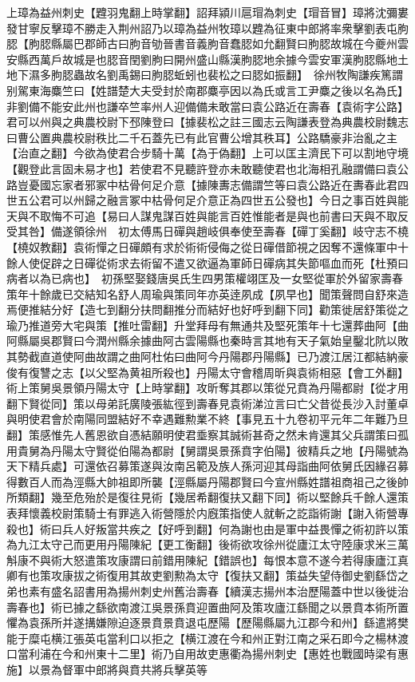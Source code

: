 上璋為益州刺史【韙羽鬼翻上時掌翻】詔拜潁川扈瑁為刺史【瑁音冒】璋將沈彌婁發甘寧反擊璋不勝走入荆州詔乃以璋為益州牧璋以韙為征東中郎將率衆擊劉表屯朐䏰【胊䏰縣屬巴郡師古曰朐音劬晉書音義朐音蠢䏰如允翻賢曰朐䏰故城在今夔州雲安縣西萬戶故城是也䏰音閏劉朐曰開州盛山縣漢胊䏰地余據今雲安軍漢朐䏰縣地土地下濕多朐䏰蟲故名劉禹錫曰朐䏰蚯蚓也裴松之曰䏰如振翻】　徐州牧陶謙疾篤謂别駕東海麋竺曰【姓譜楚大夫受封於南郡麋亭因以為氏或言工尹麋之後以名為氏】非劉備不能安此州也謙卒竺率州人迎備備未敢當曰袁公路近在壽春【袁術字公路】君可以州與之典農校尉下邳陳登曰【據裴松之註三國志云陶謙表登為典農校尉魏志曰曹公置典農校尉秩比二千石蓋先已有此官曹公增其秩耳】公路驕豪非治亂之主【治直之翻】今欲為使君合步騎十萬【為于偽翻】上可以匡主濟民下可以割地守境【觀登此言固未易才也】若使君不見聽許登亦未敢聽使君也北海相孔融謂備曰袁公路豈憂國忘家者邪冢中枯骨何足介意【據陳夀志備謂竺等曰袁公路近在夀春此君四世五公君可以州歸之融言冢中枯骨何足介意正為四世五公發也】今日之事百姓與能天與不取悔不可追【易曰人謀鬼謀百姓與能言百姓惟能者是與也前書曰天與不取反受其咎】備遂領徐州　初太傅馬日磾與趙岐俱奉使至壽春【磾丁奚翻】岐守志不橈【橈奴教翻】袁術憚之日磾頗有求於術術侵侮之從日磾借節視之因奪不還條軍中十餘人使促辟之日磾從術求去術留不遣又欲逼為軍師日磾病其失節嘔血而死【杜預曰病者以為已病也】　初孫堅娶錢唐吳氏生四男策權翊匡及一女堅從軍於外留家壽春策年十餘歲已交結知名舒人周瑜與策同年亦英逹夙成【夙早也】聞策聲問自舒來造焉便推結分好【造七到翻分扶問翻推分而結好也好呼到翻下同】勸策徙居舒策從之瑜乃推道旁大宅與策【推吐雷翻】升堂拜母有無通共及堅死策年十七還葬曲阿【曲阿縣屬吳郡賢曰今潤州縣余據曲阿古雲陽縣也秦時言其地有天子氣始皇鑿北阬以敗其勢截直道使阿曲故謂之曲阿杜佑曰曲阿今丹陽郡丹陽縣】已乃渡江居江都結納豪俊有復讐之志【以父堅為黄祖所殺也】丹陽太守會稽周昕與袁術相惡【會工外翻】術上策舅吳景領丹陽太守【上時掌翻】攻昕奪其郡以策從兄賁為丹陽都尉【從才用翻下賢從同】策以母弟託廣陵張紘徑到壽春見袁術涕泣言曰亡父昔從長沙入討董卓與明使君會於南陽同盟結好不幸遇難勲業不終【事見五十九卷初平元年二年難乃旦翻】策感惟先人舊恩欲自憑結願明使君埀察其誠術甚奇之然未肯還其父兵謂策曰孤用貴舅為丹陽太守賢從伯陽為都尉【舅謂吳景孫賁字伯陽】彼精兵之地【丹陽號為天下精兵處】可還依召募策遂與汝南呂範及族人孫河迎其母詣曲阿依舅氏因緣召募得數百人而為涇縣大帥祖即所襲【涇縣屬丹陽郡賢曰今宣州縣姓譜祖商祖己之後帥所類翻】幾至危殆於是復往見術【幾居希翻復扶又翻下同】術以堅餘兵千餘人還策表拜懷義校尉策騎士有罪逃入術營隱於内廐策指使人就斬之訖詣術謝【謝入術營專殺也】術曰兵人好叛當共疾之【好呼到翻】何為謝也由是軍中益畏憚之術初許以策為九江太守己而更用丹陽陳紀【更工衡翻】後術欲攻徐州從廬江太守陸康求米三萬斛康不與術大怒遣策攻康謂曰前錯用陳紀【錯誤也】每恨本意不遂今若得康廬江真卿有也策攻康拔之術復用其故吏劉勲為太守【復扶又翻】策益失望侍御史劉繇岱之弟也素有盛名詔書用為揚州刺史州舊治壽春【續漢志揚州本治歷陽蓋中世以後徙治壽春也】術已據之繇欲南渡江吳景孫賁迎置曲阿及策攻廬江繇聞之以景賁本術所置懼為袁孫所并遂搆嫌隙迫逐景賁景賁退屯歷陽【歷陽縣屬九江郡今和州】繇遣將樊能于糜屯横江張英屯當利口以拒之【横江渡在今和州正對江南之采石即今之楊林渡口當利浦在今和州東十二里】術乃自用故吏惠衢為揚州刺史【惠姓也戰國時梁有惠施】以景為督軍中郎將與賁共將兵擊英等

